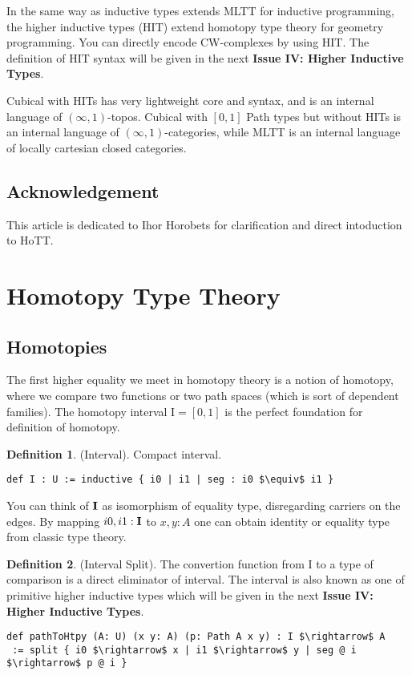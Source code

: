\documentclass{article}
\theoremstyle{definition}
\newtheorem{definition}{Definition}
\begin{document}
In the same way as inductive types extends MLTT for inductive programming,
the higher inductive types (HIT) extend homotopy type theory for geometry programming.
You can directly encode CW-complexes by using HIT. The definition of HIT syntax will
be given in the next {\bf Issue IV: Higher Inductive Types}.

Cubical with HITs has very lightweight core and syntax, and
is an internal language of $(\infty,1)$-topos.
Cubical with $[0,1]$ Path types but without HITs is an
internal language of $(\infty,1)$-categories, while MLTT
is an internal language of locally cartesian closed categories.

\subsection{Acknowledgement}
This article is dedicated to Ihor Horobets for clarification and direct intoduction to HoTT.

\newpage
\section{Homotopy Type Theory}
\subsection{Homotopies}
The first higher equality we meet in homotopy theory is a notion of homotopy,
where we compare two functions or two path spaces (which is sort of dependent families).
The homotopy interval $\mathrm{I}=[0,1]$ is the perfect foundation for definition of homotopy.

\begin{definition} (Interval). Compact interval.
\begin{lstlisting}[mathescape=true]
def I : U := inductive { i0 | i1 | seg : i0 $\equiv$ i1 }
\end{lstlisting}
\end{definition}

You can think of ${\bf I}$ as isomorphism of equality type,
disregarding carriers on the edges. By mapping $i0,i1:{\bf I}$ to $x,y:A$ one can
obtain identity or equality type from classic type theory.

\begin{definition} (Interval Split).
The convertion function from $\mathrm{I}$ to a type of comparison
is a direct eliminator of interval. The interval is also known as one of
primitive higher inductive types which will be given in the next
{\bf Issue IV: Higher Inductive Types}.
\begin{lstlisting}[mathescape=true]
def pathToHtpy (A: U) (x y: A) (p: Path A x y) : I $\rightarrow$ A
 := split { i0 $\rightarrow$ x | i1 $\rightarrow$ y | seg @ i $\rightarrow$ p @ i }
\end{lstlisting}
\end{definition}
\end{document}
